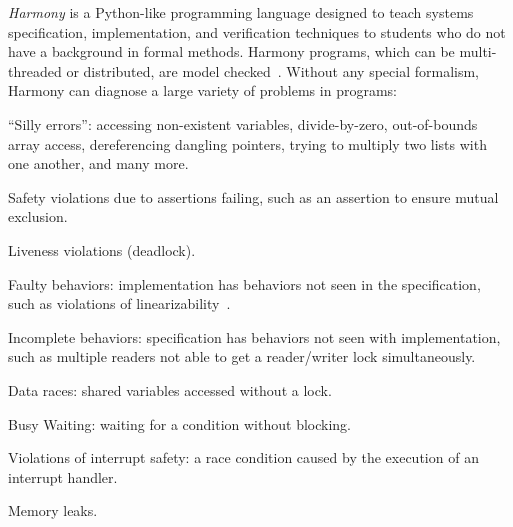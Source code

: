 \documentclass[twocolumn]{article}
\begin{document}
\emph{Harmony} is a Python-like programming language designed to teach
systems specification, implementation, and verification techniques to
students who do not have a background in formal methods.
Harmony programs, which can be multi-threaded
or distributed, are model checked~\cite{CES86}.
Without any special formalism, Harmony can diagnose a large variety
of problems in programs:
\begin{compactitem}
\item ``Silly errors'': accessing non-existent variables,
divide-by-zero, out-of-bounds array access, dereferencing dangling
pointers, trying to multiply two lists with one another,
and many more.
\item Safety violations due to assertions failing, such as an assertion to ensure mutual exclusion.
\item Liveness violations (deadlock).
\item Faulty behaviors: implementation has behaviors not seen in the specification, such as violations of linearizability~\cite{HW90}.
\item Incomplete behaviors: specification has behaviors not seen with implementation, such as multiple readers not able to get a reader/writer lock simultaneously.
\item Data races: shared variables accessed without a lock.
\item Busy Waiting: waiting for a condition without blocking.
\item Violations of interrupt safety: a race condition caused by the execution
of an interrupt handler.
\item Memory leaks.
\end{compactitem}
\end{document}
